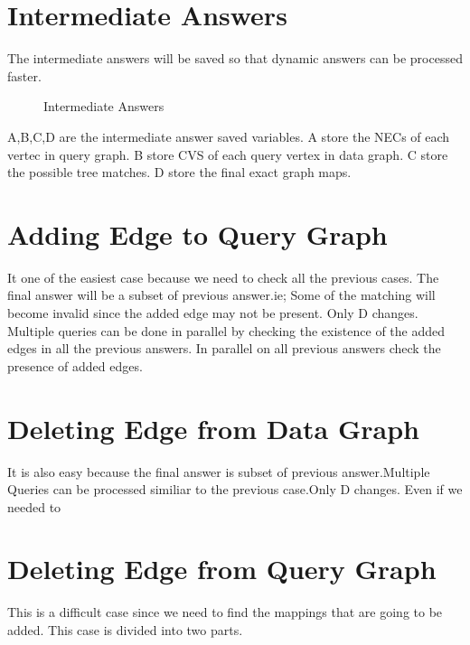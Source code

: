 \section{Intermediate Answers}
	The intermediate answers will be saved so that dynamic answers can be processed faster.
	\begin{figure}[h]
 \centering
{}

 \caption{Intermediate Answers}
\end{figure}
	\hspace{10mm} A,B,C,D are the intermediate answer saved variables. A store the NECs of each vertec in query graph. B store CVS of each query vertex in data graph. C store the possible tree matches. D store the final exact graph maps.
\section{Adding Edge to Query Graph}
 \label{sec:aq}
	\hspace{10mm} It one of the easiest case because we need to check all the previous cases. The final answer will be a subset of previous answer.ie; Some of the matching will become invalid since the added edge may not be present. Only D changes.
	\hspace{10mm} Multiple queries can be done in parallel  by checking the existence of the added edges in all the previous answers. In parallel on all previous answers check the presence of added edges.
\section{Deleting Edge from Data Graph}
 \label{sec:dd}
	\hspace{10mm} It is also easy because the final answer is subset of previous answer.Multiple Queries can be processed similiar to the previous case.Only D changes.
	\hspace{10mm} Even if we needed to 
\section{Deleting Edge from Query Graph}
 \label{sec:dq}
	\hspace{10mm} This is a difficult case since we need to find the mappings that are going to be added. This case is divided into two parts.
